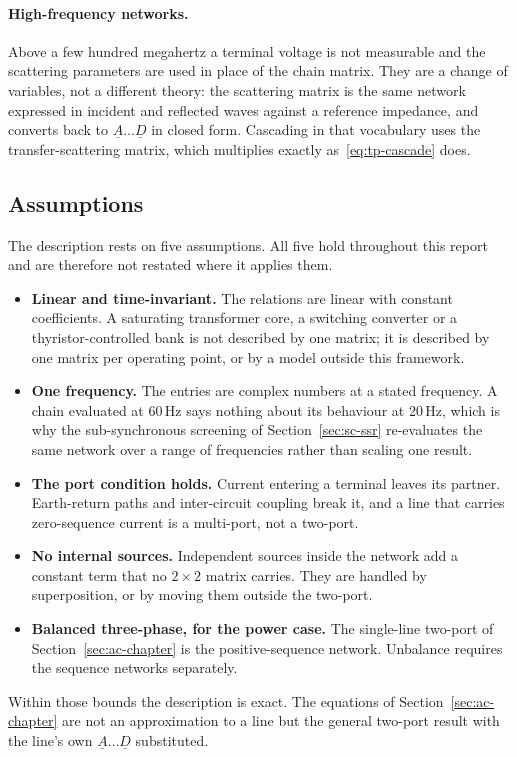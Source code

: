 \paragraph{High-frequency networks.} Above a few hundred megahertz a
terminal voltage is not measurable and the scattering parameters are used in
place of the chain matrix. They are a change of variables, not a different
theory: the scattering matrix is the same network expressed in incident and
reflected waves against a reference impedance, and converts back to
$\underline{A} \ldots \underline{D}$ in closed form. Cascading in that
vocabulary uses the transfer-scattering matrix, which multiplies exactly
as~\eqref{eq:tp-cascade} does.

\subsection{Assumptions}
\label{sec:tp-limits}

The description rests on five assumptions. All five hold throughout this
report and are therefore not restated where it applies them.

\begin{itemize}
  \setlength{\itemsep}{0.35em}
  \item \textbf{Linear and time-invariant.} The relations are linear with
        constant coefficients. A saturating transformer core, a switching
        converter or a thyristor-controlled bank is not described by one
        matrix; it is described by one matrix per operating point, or by a
        model outside this framework.
  \item \textbf{One frequency.} The entries are complex numbers at a stated
        frequency. A chain evaluated at 60\,Hz says nothing about its
        behaviour at 20\,Hz, which is why the sub-synchronous screening of
        Section~\ref{sec:sc-ssr} re-evaluates the same network over a range
        of frequencies rather than scaling one result.
  \item \textbf{The port condition holds.} Current entering a terminal
        leaves its partner. Earth-return paths and inter-circuit coupling
        break it, and a line that carries zero-sequence current is a
        multi-port, not a two-port.
  \item \textbf{No internal sources.} Independent sources inside the network
        add a constant term that no $2 \times 2$ matrix carries. They are
        handled by superposition, or by moving them outside the two-port.
  \item \textbf{Balanced three-phase, for the power case.} The single-line
        two-port of Section~\ref{sec:ac-chapter} is the positive-sequence
        network. Unbalance requires the sequence networks separately.
\end{itemize}

Within those bounds the description is exact. The equations of
Section~\ref{sec:ac-chapter} are not an approximation to a line but the
general two-port result with the line's own $\underline{A} \ldots
\underline{D}$ substituted.

\FloatBarrier
